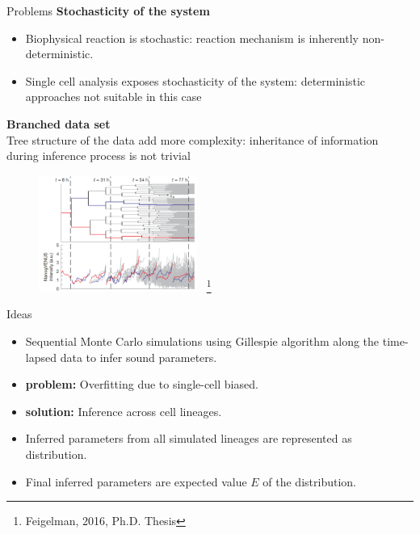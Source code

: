 \documentclass[pdf]
{beamer}
\begin{document}
\begin{frame}{Problems}
	\textbf{Stochasticity of the system}
	\begin{itemize}
	\item Biophysical reaction is stochastic: reaction mechanism is inherently non-deterministic.
	\item Single cell analysis exposes stochasticity of the system: deterministic approaches not suitable in this case
	\end{itemize}
	\textbf{Branched data set}\\
	Tree structure of the data add more complexity: inheritance of information during inference process is not trivial
	
	\begin{figure}[ht]
		\begin{center}
			\includegraphics[height=1.5in]{figures/cell-generations.png}
			~\footnote{Feigelman, 2016, Ph.D. Thesis}
		\end{center}
	\end{figure}
\end{frame}

\begin{frame}{Ideas}
	\begin{itemize}
	\item Sequential Monte Carlo simulations using Gillespie algorithm along the time-lapsed data to infer sound parameters.
	\item<2-> \textbf{problem:} Overfitting due to single-cell biased.
	\item<3-> \textbf{solution:} Inference across cell lineages.
	\item<4-> Inferred parameters from all simulated lineages are represented as distribution.
	\item<5-> Final inferred parameters are expected value $E$ of the distribution.
	\end{itemize}
\end{frame}
\end{document}
